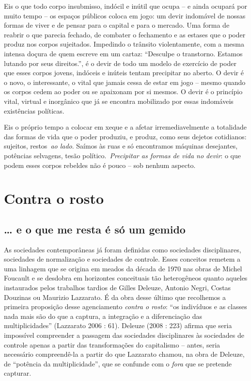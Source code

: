 Eis o que todo corpo insubmisso, indócil e inútil que ocupa -- e ainda
ocupará por muito tempo -- os espaços públicos coloca em jogo: um devir
indomável de nossas formas de viver e de pensar para o capital e para o
mercado. Uma forma de reabrir o que parecia fechado, de combater o
fechamento e as estases que o poder produz nos corpos sujeitados.
Impedindo o trânsito violentamente, com a mesma intensa doçura de quem
escreve em um cartaz: ``Desculpe o transtorno. Estamos lutando por seus
direitos.'', é o devir de todo um modelo de exercício de poder que esses
corpos jovens, indóceis e inúteis tentam precipitar no aberto. O devir é
o novo, o interessante, o vital que jamais cessa de estar em jogo --
mesmo quando os corpos cedem ao poder ou se apaixonam por si mesmos. O
devir é o princípio vital, virtual e inorgânico que já se encontra
mobilizado por essas indomáveis existências políticas.

Eis o próprio tempo a colocar em xeque e a afetar irremediavelmente a
totalidade das formas de vida que o poder produziu, e produz, como seus
dejetos cotidianos: sujeitos, restos~\emph{ao lado}. Saímos às ruas e só
encontramos máquinas desejantes, potências selvagens, tesão
político.~\emph{Precipitar as formas de vida no devir}: o que podem
esses corpos rebeldes não é pouco -- sob nenhum aspecto.

\chapter{Contra o rosto}


\section{\ldots{} e o que me resta é só um gemido}

As sociedades contemporâneas já foram definidas como sociedades
disciplinares, sociedades de normalização e sociedades de controle.
Esses conceitos remetem a uma linhagem que se origina em meados da
década de 1970 nas obras de Michel Foucault e se desdobra em horizontes
conceituais tão heterogêneos quanto aqueles instaurados pelos trabalhos
tardios de Gilles Deleuze, Antonio Negri, Costas Douzinas ou Maurizio
Lazzarato. É da obra desse último que recolhemos a primeira proposição
desse agenciamento \emph{contra o rosto}: ``os indivíduos e as classes
nada mais são do que a captura, a integração e a diferenciação das
multiplicidades'' (Lazzarato 2006 : 61). Deleuze (2008 : 223) afirma que
seria impossível compreender a passagem das sociedades disciplinares às
sociedades de controle apenas a partir das transformações do capitalismo
-- antes, seria necessário compreendê-la a partir do que Lazzarato
chamou, na obra de Deleuze, de ``potência da multiplicidade'', que se
confunde com o \emph{fora} que se pretende capturar.

